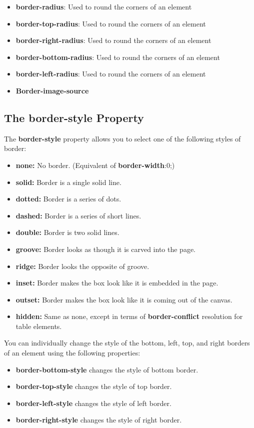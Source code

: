 \documentclass{report}
\begin{document}
\begin{itemize}
        \item \textbf{border-radius}: Used to round the corners of an element
        \item \textbf{border-top-radius}: Used to round the corners of an element
        \item \textbf{border-right-radius}: Used to round the corners of an element
        \item \textbf{border-bottom-radius}: Used to round the corners of an element
        \item \textbf{border-left-radius}: Used to round the corners of an element
        \item \textbf{Border-image-source}
    \end{itemize}

    \bigbreak \noindent 
    \subsection{The \textbf{border-style} Property}
    \bigbreak \noindent 
    The \textbf{border-style} property allows you to select one of the following styles of border:
    \begin{itemize}
        \item \textbf{none:} No border. (Equivalent of \textbf{border-width}:0;)
        \item \textbf{solid:} Border is a single solid line.
        \item \textbf{dotted:} Border is a series of dots.
        \item \textbf{dashed:} Border is a series of short lines.
        \item \textbf{double:} Border is two solid lines.
        \item \textbf{groove:} Border looks as though it is carved into the page.
        \item \textbf{ridge:} Border looks the opposite of groove.
        \item \textbf{inset:} Border makes the box look like it is embedded in the page.
        \item \textbf{outset:} Border makes the box look like it is coming out of the canvas.
        \item \textbf{hidden:} Same as none, except in terms of \textbf{border-conflict} resolution for table elements.
    \end{itemize}
    \bigbreak \noindent 
    You can individually change the style of the bottom, left, top, and right borders
of an element using the following properties:
\begin{itemize}
    \item \textbf{border-bottom-style} changes the style of bottom border.
    \item \textbf{border-top-style} changes the style of top border.
    \item \textbf{border-left-style} changes the style of left border.
    \item \textbf{border-right-style} changes the style of right border.
\end{itemize}
\end{document}
